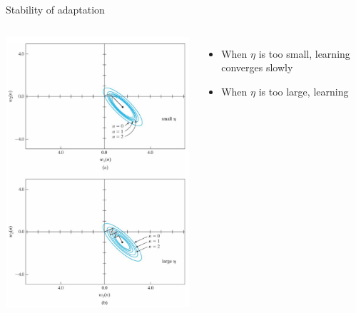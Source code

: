 \documentclass[notes]{beamer}
\newcommand{\begincols}[1]{\begin{columns}{#1}}
\newcommand{\stopcols}{\end{columns}}
\providecommand{\tightlist}{%
  \setlength{\itemsep}{0pt}\setlength{\parskip}{0pt}}
\begin{document}
\begin{frame}{Stability of adaptation}

\begincols{}


\includegraphics[width=1.00000\textwidth]{2018-03-10-10-13-18.png}\\


\begin{itemize}
\tightlist
\item
  When \(\eta\) is too small, learning converges slowly
\item
  When \(\eta\) is too large, learning
\end{itemize}

\stopcols

\end{frame}
\end{document}
